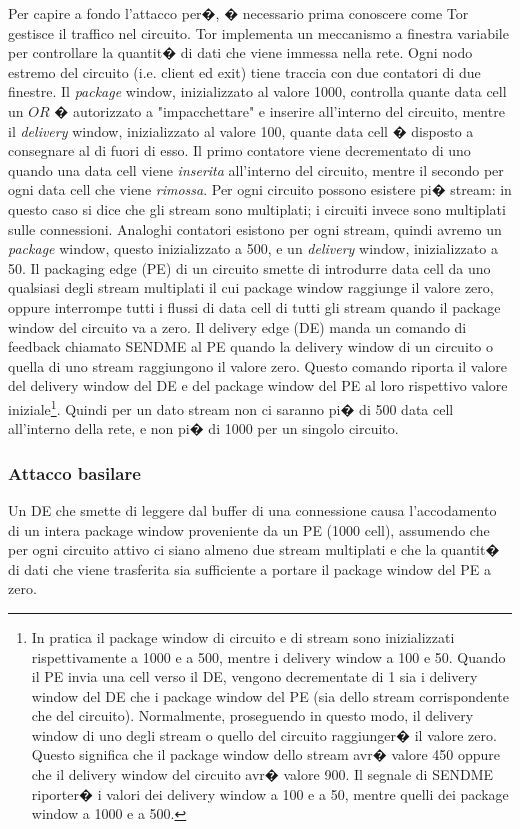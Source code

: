 Per capire a fondo l'attacco per�, � necessario prima conoscere come Tor gestisce il traffico nel circuito. Tor implementa un meccanismo a  finestra variabile per controllare la quantit� di dati che viene immessa nella rete. Ogni nodo estremo del circuito (i.e. client ed exit) tiene traccia con due contatori di due finestre. Il \emph{package} window, inizializzato al valore 1000, controlla quante data cell un $OR$ � autorizzato a "impacchettare" e inserire all'interno del circuito, mentre il \emph{delivery} window, inizializzato al valore 100, quante data cell � disposto a consegnare al di fuori di esso. Il primo contatore viene decrementato di uno quando una data cell viene \emph{inserita} all'interno del circuito, mentre il secondo per ogni data cell che viene \emph{rimossa}. Per ogni circuito possono esistere pi� stream: in questo caso si dice che gli stream sono multiplati; i circuiti invece sono multiplati sulle connessioni. Analoghi contatori esistono per ogni stream, quindi avremo un \emph{package} window, questo inizializzato a 500, e un \emph{delivery} window, inizializzato a 50. Il packaging edge (PE) di un circuito smette di introdurre data cell da uno qualsiasi degli stream multiplati il cui package window raggiunge il valore zero, oppure interrompe tutti i flussi di data cell di tutti gli stream quando il package window del circuito va a zero. Il delivery edge (DE) manda un comando di feedback chiamato {\ttfamily SENDME} al PE quando la delivery window di un circuito o quella di uno stream raggiungono il valore zero. Questo comando riporta il valore del delivery window del DE e del package window del PE al loro rispettivo valore iniziale\footnote{In pratica il package window di circuito e di stream sono inizializzati rispettivamente a 1000 e a 500, mentre i delivery window a 100 e 50. Quando il PE invia una cell verso il DE, vengono decrementate di 1 sia i delivery window del DE che i package window del PE (sia dello stream corrispondente che del circuito). Normalmente, proseguendo in questo modo, il delivery window di uno degli stream o quello del circuito raggiunger� il valore zero. Questo significa che il package window dello stream avr� valore 450 oppure che il delivery window del circuito avr� valore 900. Il segnale di {\ttfamily SENDME} riporter� i valori dei delivery window a 100 e a 50, mentre quelli dei package window a 1000 e a 500.}. Quindi per un dato stream non ci saranno pi� di 500 data cell all'interno della rete, e non pi� di 1000 per un singolo circuito.
\subsubsection{Attacco basilare}
Un DE che smette di leggere dal buffer di una connessione causa l'accodamento di un intera package window proveniente da un PE (1000 cell), assumendo che per ogni circuito attivo ci siano almeno due stream multiplati e che la quantit� di dati che viene trasferita sia sufficiente a portare il package window del PE a zero.

